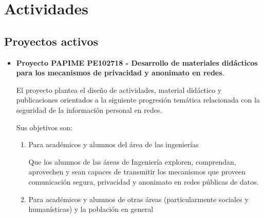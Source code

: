 \documentclass[a4paper,11pt]{article}                 %
\begin{document}
  \section{Actividades}
  
  \subsection{Proyectos activos}
  \begin{itemize}
    \item  \textbf{Proyecto PAPIME PE102718 - Desarrollo de materiales didácticos para los mecanismos de privacidad y anonimato en redes}. 
    
    El  proyecto plantea el diseño de actividades, material didáctico y publicaciones orientados
a la siguiente progresión temática relacionada con la seguridad de la información personal en redes.
    
    Sus objetivos son:
    \begin{enumerate}
      \item Para académicos y alumnos del área de las ingenierías
     
      Que los alumnos de las áreas de Ingeniería exploren, comprendan, aprovechen y sean capaces de
transmitir los mecanismos que proveen comunicación segura, privacidad y anonimato en redes públicas
de datos.
      \item Para académicos y alumnos de otras áreas (particularmente sociales y humanísticas) y la población
en general


\end{enumerate}
\end{itemize}
\end{document}
